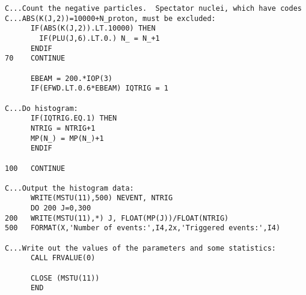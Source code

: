 \begin{verbatim}
C...Count the negative particles.  Spectator nuclei, which have codes
C...ABS(K(J,2))=10000+N_proton, must be excluded:
      IF(ABS(K(J,2)).LT.10000) THEN
        IF(PLU(J,6).LT.0.) N_ = N_+1
      ENDIF
70    CONTINUE

      EBEAM = 200.*IOP(3)
      IF(EFWD.LT.0.6*EBEAM) IQTRIG = 1

C...Do histogram:
      IF(IQTRIG.EQ.1) THEN
      NTRIG = NTRIG+1
      MP(N_) = MP(N_)+1
      ENDIF

100   CONTINUE

C...Output the histogram data:  
      WRITE(MSTU(11),500) NEVENT, NTRIG
      DO 200 J=0,300
200   WRITE(MSTU(11),*) J, FLOAT(MP(J))/FLOAT(NTRIG)
500   FORMAT(X,'Number of events:',I4,2x,'Triggered events:',I4)

C...Write out the values of the parameters and some statistics:
      CALL FRVALUE(0)
 		
      CLOSE (MSTU(11))
      END
\end{verbatim}


